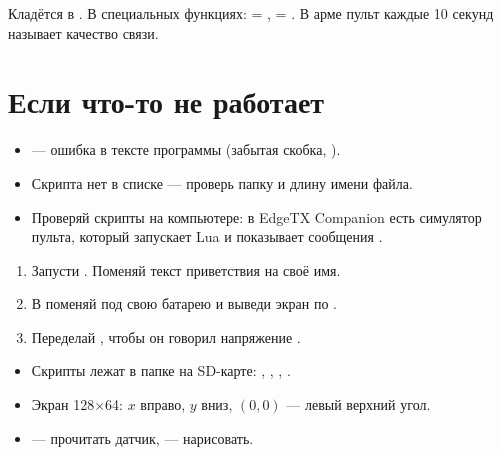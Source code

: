 Кладётся в . В специальных функциях:  =
,  = . В арме пульт каждые 10 секунд называет
качество связи.

\section{Если что-то не работает}

\begin{itemize}
  \item {} --- ошибка в тексте программы (забытая скобка, ).
  \item Скрипта нет в списке --- проверь папку и длину имени файла.
  \item Проверяй скрипты на компьютере: в EdgeTX Companion есть симулятор пульта, который
        запускает Lua и показывает сообщения .
\end{itemize}

\begin{tryit}
\begin{enumerate}
  \item Запусти . Поменяй текст приветствия на своё имя.
  \item В  поменяй  под свою батарею и выведи экран по .
  \item Переделай , чтобы он говорил напряжение .
\end{enumerate}
\end{tryit}

\begin{summary}
\begin{itemize}
  \item Скрипты лежат в папке  на SD-карте: , ,
        , .
  \item Экран 128×64: $x$ вправо, $y$ вниз, $(0,0)$ --- левый верхний угол.
  \item {} --- прочитать датчик,  --- нарисовать.
\end{itemize}
\end{summary}
